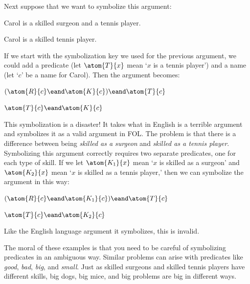 Next suppose that we want to symbolize this argument:
\begin{earg}
\label{surgeon3}
\item Carol is a skilled surgeon and a tennis player. 
\item[\texttherefore] Carol is a skilled tennis player.
\end{earg}
If we start with the symbolization key we used for the previous
argument, we could add a predicate (let $\atom{T}{x}$ mean `$x$ is a
tennis player') and a name (let `$c$' be a name for Carol). Then the
argument becomes:
\begin{earg}
\item[] $(\atom{R}{c} \eand \atom{K}{c}) \eand \atom{T}{c}$
\item[\texttherefore] $\atom{T}{c} \eand \atom{K}{c}$
\end{earg}
This symbolization is a disaster! It takes what in English is a terrible argument and symbolizes it as a valid argument in FOL. The problem is that there is a difference between being \emph{skilled as a surgeon} and \emph{skilled as a tennis player}. Symbolizing this argument correctly requires two separate predicates, one for each type of skill. If we let $\atom{K_1}{x}$ mean `$x$ is skilled as a surgeon' and $\atom{K_2}{x}$ mean `$x$ is skilled as a tennis player,' then we can symbolize the argument in this way:
\begin{earg}
\label{surgeon3correct}
\item[] $(\atom{R}{c} \eand \atom{K_1}{c}) \eand \atom{T}{c}$
\item[\texttherefore] $\atom{T}{c} \eand \atom{K_2}{c}$
\end{earg}
Like the English language argument it symbolizes, this is invalid. %

The moral of these examples is that you need to be careful of symbolizing predicates in an ambiguous way. Similar problems can arise with predicates like \emph{good}, \emph{bad}, \emph{big}, and \emph{small}. Just as skilled surgeons and skilled tennis players have different skills, big dogs, big mice, and big problems are big in different ways.

